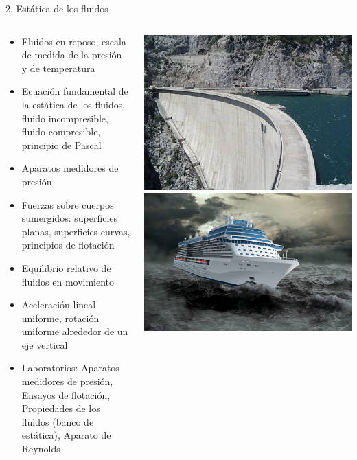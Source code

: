 \documentclass [xcolor=svgnames, t] {beamer}
\begin{document}
\begin{frame}{2. Est\'atica de los fluidos}
\vspace{-0.9cm}
\begin{columns}
\begin{exampleblock}{}
\begin{itemize}
\small
\item Fluidos en reposo, escala de medida de la presión y de temperatura
\item Ecuación fundamental de la estática de los fluidos, fluido incompresible, fluido compresible, principio de Pascal
\item Aparatos medidores de presión
\item Fuerzas sobre cuerpos sumergidos: superficies planas, superficies curvas, principios de flotación
\item Equilibrio relativo de fluidos en movimiento
\item Aceleración lineal uniforme, rotación uniforme alrededor de un eje vertical
\item \alert{Laboratorios: Aparatos medidores de presión, Ensayos de flotación, Propiedades de los fluidos (banco de estática), Aparato de Reynolds}
\end{itemize}
\end{exampleblock}
\begin{center}
\includegraphics[width=\textwidth]{fme}
\includegraphics[width=\textwidth]{fme1}

\end{center}
\end{columns}
\end{frame}
\end{document}
